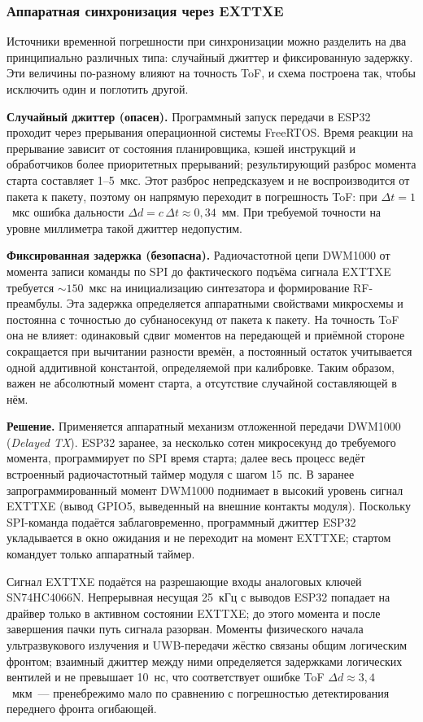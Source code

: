 \documentclass[a4paper,11pt]{article} %
\begin{document}
\subsubsection{Аппаратная синхронизация через EXTTXE}

Источники временной погрешности при синхронизации можно разделить на два принципиально
различных типа: случайный джиттер и фиксированную задержку. Эти величины по-разному
влияют на точность ToF, и схема построена так, чтобы исключить один и поглотить другой.

\textbf{Случайный джиттер (опасен).}
Программный запуск передачи в ESP32 проходит через прерывания операционной системы
FreeRTOS. Время реакции на прерывание зависит от состояния планировщика, кэшей
инструкций и обработчиков более приоритетных прерываний; результирующий разброс
момента старта составляет 1--5~мкс. Этот разброс непредсказуем и не воспроизводится
от пакета к пакету, поэтому он напрямую переходит в погрешность ToF: при $\Delta t = 1$~мкс
ошибка дальности $\Delta d = c\,\Delta t \approx 0{,}34$~мм. При требуемой точности
на уровне миллиметра такой джиттер недопустим.

\textbf{Фиксированная задержка (безопасна).}
Радиочастотной цепи DWM1000 от момента записи команды по SPI до фактического подъёма
сигнала EXTTXE требуется ${\sim}150$~мкс на инициализацию синтезатора и формирование
RF-преамбулы. Эта задержка определяется аппаратными свойствами микросхемы и постоянна
с точностью до субнаносекунд от пакета к пакету. На точность ToF она не влияет:
одинаковый сдвиг моментов на передающей и приёмной стороне сокращается при вычитании
разности времён, а постоянный остаток учитывается одной аддитивной константой,
определяемой при калибровке. Таким образом, важен не абсолютный момент старта,
а отсутствие случайной составляющей в нём.

\textbf{Решение.}
Применяется аппаратный механизм отложенной передачи DWM1000 (\textit{Delayed TX}).
ESP32 заранее, за несколько сотен микросекунд до требуемого момента, программирует
по SPI время старта; далее весь процесс ведёт встроенный радиочастотный таймер модуля
с шагом 15~пс. В заранее запрограммированный момент DWM1000 поднимает в высокий уровень
сигнал EXTTXE (вывод GPIO5, выведенный на внешние контакты модуля). Поскольку SPI-команда
подаётся заблаговременно, программный джиттер ESP32 укладывается в окно ожидания и
не переходит на момент EXTTXE; стартом командует только аппаратный таймер.

Сигнал EXTTXE подаётся на разрешающие входы аналоговых ключей SN74HC4066N.
Непрерывная несущая 25~кГц с выводов ESP32 попадает на драйвер только в активном
состоянии EXTTXE; до этого момента и после завершения пачки путь сигнала разорван.
Моменты физического начала ультразвукового излучения и UWB-передачи жёстко связаны
общим логическим фронтом; взаимный джиттер между ними определяется задержками
логических вентилей и не превышает 10~нс, что соответствует ошибке ToF
$\Delta d \approx 3{,}4$~мкм~--- пренебрежимо мало по сравнению с погрешностью
детектирования переднего фронта огибающей.
\end{document}
